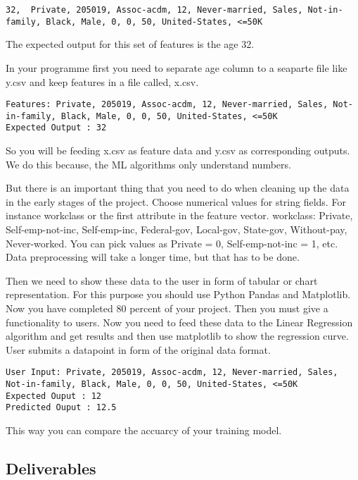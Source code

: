 \begin{lstlisting}
32,  Private, 205019, Assoc-acdm, 12, Never-married, Sales, Not-in-family, Black, Male, 0, 0, 50, United-States, <=50K
\end{lstlisting}

The expected output for this set of features is the age 32.

In your programme first you need to separate age column to a seaparte
file like y.csv and keep features in a file called, x.csv.
\begin{lstlisting}
Features: Private, 205019, Assoc-acdm, 12, Never-married, Sales, Not-in-family, Black, Male, 0, 0, 50, United-States, <=50K
Expected Output : 32
\end{lstlisting}

So you will be feeding x.csv as feature data and y.csv as
corresponding outputs. We do this because, the ML algorithms only
understand numbers.

But there is an important thing that you need to do when cleaning up
the data in the early stages of the project. Choose numerical values
for string fields.  For instance workclass or the first attribute in
the feature vector.  workclass: Private, Self-emp-not-inc,
Self-emp-inc, Federal-gov, Local-gov, State-gov, Without-pay,
Never-worked.  You can pick values as Private = 0, Self-emp-not-inc =
1, etc. Data preprocessing will take a longer time, but that has to be done. 


Then we need to show these data to the user in form of tabular or
chart representation. For this purpose you should use Python Pandas
and Matplotlib.  Now you have completed 80 percent of your
project. Then you must give a functionality to users. Now you need to
feed these data to the Linear Regression algorithm and get results and
then use matplotlib to show the regression curve. User submits a datapoint
in form of the original data format.

\begin{lstlisting}
User Input: Private, 205019, Assoc-acdm, 12, Never-married, Sales, Not-in-family, Black, Male, 0, 0, 50, United-States, <=50K
Expected Ouput : 12
Predicted Ouput : 12.5
\end{lstlisting}

This way you can compare the accuarcy of your training model.


\subsection{Deliverables}

